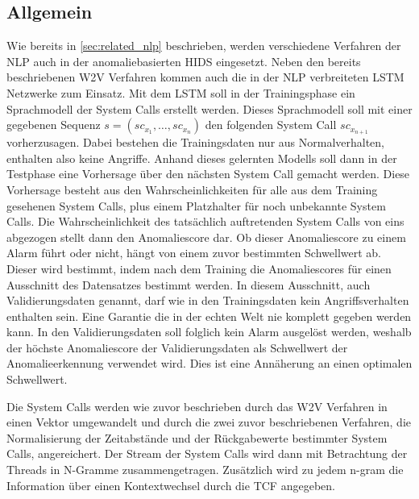         \subsection{Allgemein}\label{sec:Allgemein}
            Wie bereits in \autoref{sec:related_nlp} beschrieben, werden verschiedene Verfahren der \ac{NLP} auch in der anomaliebasierten \ac{HIDS} eingesetzt.
            Neben den bereits beschriebenen \ac{W2V} Verfahren kommen auch die in der \ac{NLP} verbreiteten \ac{LSTM} Netzwerke zum Einsatz.
            Mit dem \ac{LSTM} soll in der Trainingsphase ein Sprachmodell der System Calls erstellt werden.
            Dieses Sprachmodell soll mit einer gegebenen Sequenz $s = (sc_{x_1},\dots,sc_{x_n})$ den folgenden System Call $sc_{x_{n+1}}$ vorherzusagen. 
            Dabei bestehen die Trainingsdaten nur aus Normalverhalten, enthalten also keine Angriffe.
            Anhand dieses gelernten Modells soll dann in der Testphase eine Vorhersage über den nächsten System Call gemacht werden.
            Diese Vorhersage besteht aus den Wahrscheinlichkeiten für alle aus dem Training gesehenen System Calls, plus einem Platzhalter für noch unbekannte System Calls.
            Die Wahrscheinlichkeit des tatsächlich auftretenden System Calls von eins abgezogen stellt dann den Anomaliescore dar.
            Ob dieser Anomaliescore zu einem Alarm führt oder nicht, hängt von einem zuvor bestimmten Schwellwert ab.
            Dieser wird bestimmt, indem nach dem Training die Anomaliescores für einen Ausschnitt des Datensatzes bestimmt werden.
            In diesem Ausschnitt, auch Validierungsdaten genannt, darf wie in den Trainingsdaten kein Angriffsverhalten enthalten sein.
            Eine Garantie die in der echten Welt nie komplett gegeben werden kann.
            In den Validierungsdaten soll folglich kein Alarm ausgelöst werden, weshalb der höchste Anomaliescore der Validierungsdaten als Schwellwert der Anomalieerkennung verwendet wird.
            Dies ist eine Annäherung an einen optimalen Schwellwert.

            Die System Calls werden wie zuvor beschrieben durch das \ac{W2V} Verfahren in einen Vektor umgewandelt und durch die zwei zuvor beschriebenen Verfahren, die Normalisierung der Zeitabstände und der Rückgabewerte bestimmter System Calls, angereichert.
            Der Stream der System Calls wird dann mit Betrachtung der Threads in N-Gramme zusammengetragen.
            Zusätzlich wird zu jedem n-gram die Information über einen Kontextwechsel durch die \ac{TCF} angegeben.

